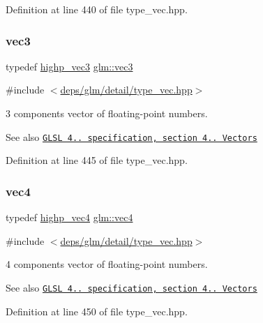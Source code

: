 Definition at line 440 of file type\+\_\+vec.\+hpp.

\mbox{\label{group__core__types_ga1c47e8b3386109bc992b6c48e91b0be7}} 
\subsubsection{\texorpdfstring{vec3}{vec3}}
{\footnotesize\ttfamily typedef \hyperlink{group__core__precision_ga37ff190d92f9be26223a5de4153b9133}{highp\+\_\+vec3} \hyperlink{group__core__types_ga1c47e8b3386109bc992b6c48e91b0be7}{glm\+::vec3}}



{\ttfamily \#include $<$\hyperlink{type__vec_8hpp}{deps/glm/detail/type\+\_\+vec.\+hpp}$>$}

3 components vector of floating-\/point numbers.

\begin{DoxySeeAlso}{See also}
\href{http://www.opengl.org/registry/doc/GLSLangSpec.4.20.8.pdf}{\tt G\+L\+SL 4.. specification, section 4.. Vectors} 
\end{DoxySeeAlso}


Definition at line 445 of file type\+\_\+vec.\+hpp.

\mbox{\label{group__core__types_ga5881b1b022d7fd1b7218f5916532dd02}} 
\subsubsection{\texorpdfstring{vec4}{vec4}}
{\footnotesize\ttfamily typedef \hyperlink{group__core__precision_ga27638826fa491205403b39198c49e9f5}{highp\+\_\+vec4} \hyperlink{group__core__types_ga5881b1b022d7fd1b7218f5916532dd02}{glm\+::vec4}}



{\ttfamily \#include $<$\hyperlink{type__vec_8hpp}{deps/glm/detail/type\+\_\+vec.\+hpp}$>$}

4 components vector of floating-\/point numbers.

\begin{DoxySeeAlso}{See also}
\href{http://www.opengl.org/registry/doc/GLSLangSpec.4.20.8.pdf}{\tt G\+L\+SL 4.. specification, section 4.. Vectors} 
\end{DoxySeeAlso}


Definition at line 450 of file type\+\_\+vec.\+hpp.


